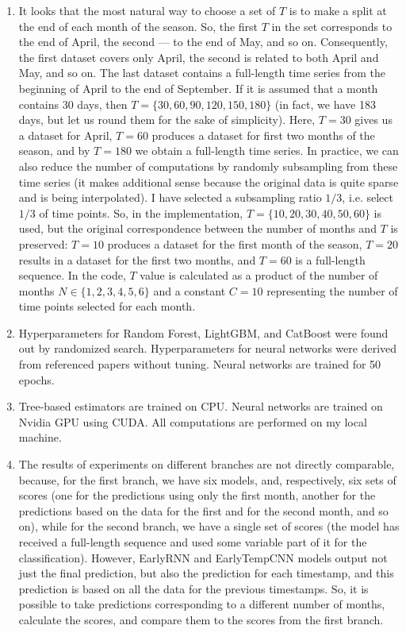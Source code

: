 \documentclass{article}
\begin{document}
\begin{enumerate}
    \item  It looks that the most natural way to choose a set of $T$ is to make a split at the end of each month of the season. So, the first $T$ in the set corresponds to the end of April, the second — to the end of May, and so on. Consequently, the first dataset covers only April, the second is related to both April and May, and so on. The last dataset contains a full-length time series from the beginning of April to the end of September. If it is assumed that a month contains 30 days, then $T = \{30, 60, 90, 120, 150, 180\}$ (in fact, we have 183 days, but let us round them for the sake of simplicity). Here, $T = 30$ gives us a dataset for April, $T = 60$ produces a dataset for first two months of the season, and by $T = 180$ we obtain a full-length time series. In practice, we can also reduce the number of computations by randomly subsampling from these time series (it makes additional sense because the original data is quite sparse and is being interpolated). I have selected a subsampling ratio $1/3$, i.e. select $1/3$ of time points. So, in the implementation, $T = \{10, 20, 30, 40, 50, 60\}$ is used, but the original correspondence between the number of months and $T$ is preserved: $T = 10$ produces a dataset for the first month of the season, $T = 20$ results in a dataset for the first two months, and $T = 60$ is a full-length sequence. In the code, $T$ value is calculated as a product of the number of months $N \in \{1, 2, 3, 4, 5, 6\}$ and a constant $C = 10$ representing the number of time points selected for each month.
    \item Hyperparameters for Random Forest, LightGBM, and CatBoost were found out by randomized search. Hyperparameters for neural networks were derived from referenced papers without tuning. Neural networks are trained for 50 epochs.
    \item  Tree-based estimators are trained on CPU. Neural networks are trained on Nvidia GPU using CUDA. All computations are performed on my local machine.
    \item The results of experiments on different branches are not directly comparable, because, for the first branch, we have six models, and, respectively, six sets of scores (one for the predictions using only the first month, another for the predictions based on the data for the first and for the second month, and so on), while for the second branch, we have a single set of scores (the model has received a full-length sequence and used some variable part of it for the classification). However, EarlyRNN and EarlyTempCNN models output not just the final prediction, but also the prediction for each timestamp, and this prediction is based on all the data for the previous timestamps. So, it is possible to take predictions corresponding to a different number of months, calculate the scores, and compare them to the scores from the first branch.
\end{enumerate}
\end{document}
